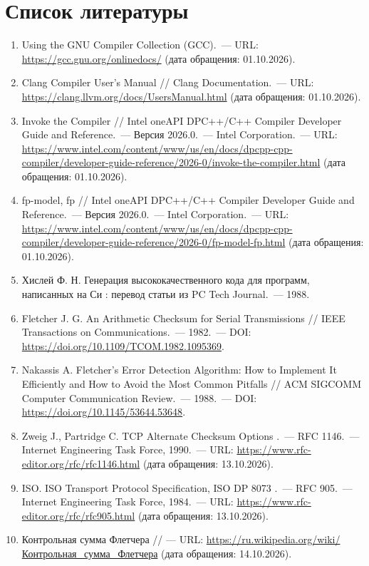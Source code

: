 \documentclass[a4paper]{article}
\begin{document}
\section*{Список литературы}
\begin{enumerate}
    \item Using the GNU Compiler Collection (GCC).~--- URL: \url{https://gcc.gnu.org/onlinedocs/} (дата обращения: 01.10.2026).
    \item Clang Compiler User's Manual  // Clang Documentation.~--- URL: \url{https://clang.llvm.org/docs/UsersManual.html} (дата обращения: 01.10.2026).
    \item Invoke the Compiler // Intel oneAPI DPC++/C++ Compiler Developer Guide and Reference.~--- Версия 2026.0.~--- Intel Corporation.~--- URL: \url{https://www.intel.com/content/www/us/en/docs/dpcpp-cpp-compiler/developer-guide-reference/2026-0/invoke-the-compiler.html} (дата обращения: 01.10.2026).
    \item fp-model, fp // Intel oneAPI DPC++/C++ Compiler Developer Guide and Reference.~--- Версия 2026.0.~--- Intel Corporation.~--- URL: \url{https://www.intel.com/content/www/us/en/docs/dpcpp-cpp-compiler/developer-guide-reference/2026-0/fp-model-fp.html} (дата обращения: 01.10.2026).
    \item Хислей Ф. Н. Генерация высококачественного кода для программ, написанных на Си : перевод статьи из PC Tech Journal.~--- 1988.
    \item Fletcher J. G. An Arithmetic Checksum for Serial Transmissions // IEEE Transactions on Communications.~--- 1982.~--- DOI: \url{https://doi.org/10.1109/TCOM.1982.1095369}.
    \item Nakassis A. Fletcher's Error Detection Algorithm: How to Implement It Efficiently and How to Avoid the Most Common Pitfalls // ACM SIGCOMM Computer Communication Review.~--- 1988.~--- DOI: \url{https://doi.org/10.1145/53644.53648}.
    \item Zweig J., Partridge C. TCP Alternate Checksum Options .~--- RFC 1146.~--- Internet Engineering Task Force, 1990.~--- URL: \url{https://www.rfc-editor.org/rfc/rfc1146.html} (дата обращения: 13.10.2026).
    \item ISO. ISO Transport Protocol Specification, ISO DP 8073 .~--- RFC 905.~--- Internet Engineering Task Force, 1984.~--- URL: \url{https://www.rfc-editor.org/rfc/rfc905.html} (дата обращения: 13.10.2026).
    \item Контрольная сумма Флетчера  // --- URL: \url{https://ru.wikipedia.org/wiki/Контрольная_сумма_Флетчера} (дата обращения: 14.10.2026).
\end{enumerate}
\end{document}
